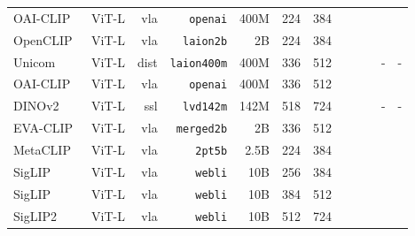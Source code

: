 \begin{tabular}{l@{\lsp}rrrrrr@{\lsp}CCCCC}
OAI-CLIP~\cite{clip}             & ViT-L & vla & \texttt{openai}    & 400M & 224  & 384 &  &  &   &   &   \\
OpenCLIP~\cite{iww+21,cbw+23}    & ViT-L & vla & \texttt{laion2b}   & 2B   & 224  & 384 &  &  &   &   &   \\
Unicom~\cite{ady+23}             & ViT-L & dist& \texttt{laion400m} & 400M & 336  & 512 &  &  &  & -           & -           \\
OAI-CLIP~\cite{clip}             & ViT-L & vla & \texttt{openai}    & 400M & 336  & 512 &  &  &   &   &   \\
DINOv2~\cite{odm+24}             & ViT-L & ssl & \texttt{lvd142m}   & 142M & 518  & 724 &  &  &  & -           & -           \\
EVA-CLIP~\cite{evaclip}          & ViT-L & vla & \texttt{merged2b}  & 2B   & 336  & 512 &  &  &  &   &  \\
MetaCLIP~\cite{metaclip}         & ViT-L & vla & \texttt{2pt5b}     & 2.5B & 224  & 384 &  &  &  &   &  \\
SigLIP~\cite{siglip}             & ViT-L & vla & \texttt{webli}     & 10B  & 256  & 384 &  &  &  &  &  \\
SigLIP~\cite{siglip}             & ViT-L & vla & \texttt{webli}     & 10B  & 384  & 512 &  &  &  &  &  \\
SigLIP2~\cite{siglip2}           & ViT-L & vla & \texttt{webli}     & 10B  & 512  & 724 &  &  &  &  &  \\
\bottomrule
\end{tabular}